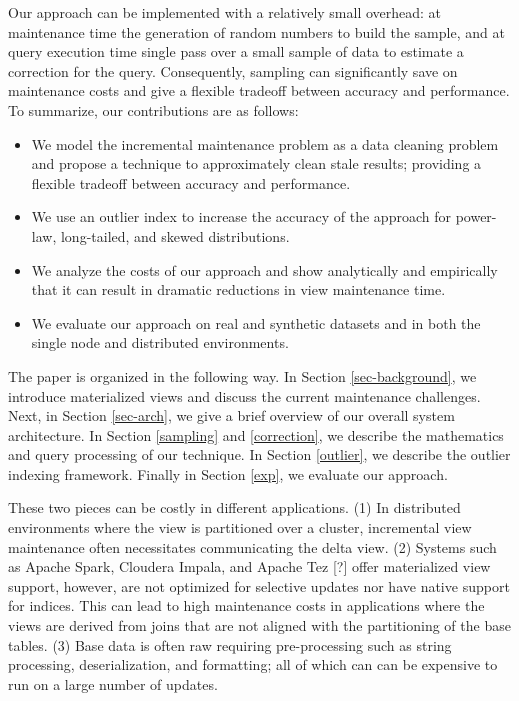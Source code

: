 Our approach can be implemented with a relatively small overhead: at maintenance time the generation of random numbers to build the sample, and at query execution time single pass over a small sample of data to estimate a correction for the query.
Consequently, sampling can significantly save on maintenance costs and give a flexible tradeoff between accuracy and performance.
To summarize, our contributions are as follows:
\begin{itemize}
  \item We model the incremental maintenance problem as a data cleaning problem and propose a technique to approximately clean stale results; providing a flexible tradeoff between accuracy and performance.
  \item We use an outlier index to increase the accuracy of the approach for power-law, long-tailed, and skewed distributions.
  \item We analyze the costs of our approach and show analytically and empirically that it can result in dramatic reductions in view maintenance time.
  \item We evaluate our approach on real and synthetic datasets and in both the single node and distributed environments.
\end{itemize}

The paper is organized in the following way. 
In Section \ref{sec-background}, we introduce materialized views and discuss the current maintenance challenges.
Next, in Section \ref{sec-arch}, we give a brief overview of our overall system architecture.
In Section \ref{sampling} and \ref{correction}, we describe the mathematics and query processing of our technique.
In Section \ref{outlier}, we describe the outlier indexing framework.
Finally in Section \ref{exp}, we evaluate our approach.

\iffalse
 These two pieces can be costly in different
applications. (1) In distributed environments where the view is partitioned
over a cluster, incremental view maintenance often necessitates communicating
the delta view. (2) Systems such as Apache Spark, Cloudera Impala,
and Apache Tez {[}?{]} offer materialized view support, however, are
not optimized for selective updates nor have native support for indices.
This can lead to high maintenance costs in applications where the
views are derived from joins that are not aligned with the partitioning
of the base tables. (3) Base data is often raw requiring pre-processing
such as string processing, deserialization, and formatting; all of
which can can be expensive to run on a large number of updates. 



